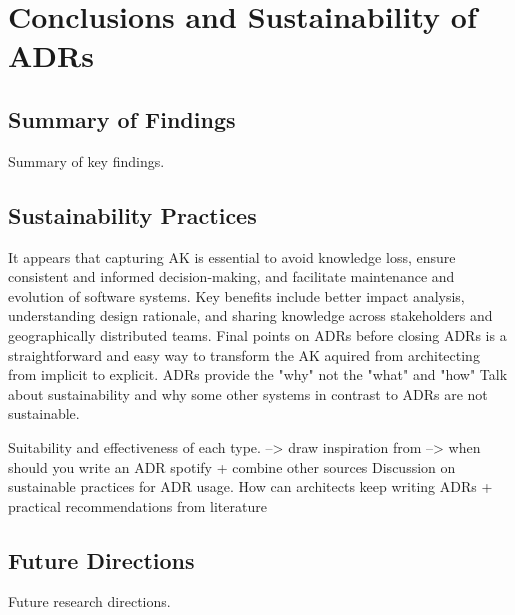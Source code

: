 \chapter{Conclusions and Sustainability of ADRs}
    \section{Summary of Findings}
        Summary of key findings.
    \section{Sustainability Practices}
        It appears that capturing AK is essential to avoid knowledge loss, ensure consistent and informed decision-making, and facilitate maintenance and evolution of software systems.
        Key benefits include better impact analysis, understanding design rationale, and sharing knowledge across stakeholders and geographically distributed teams.
        Final points on ADRs before closing
            ADRs is a straightforward and easy way to transform the AK aquired from architecting from implicit to explicit.
            ADRs provide the "why" not the "what" and "how"
            Talk about sustainability and why some other systems in contrast to ADRs are not sustainable.
            
            Suitability and effectiveness of each type. --> draw inspiration from --> when should you write an ADR spotify + combine other sources
        Discussion on sustainable practices for ADR usage. How can architects keep writing ADRs + practical recommendations from literature
    \section{Future Directions}
        Future research directions.